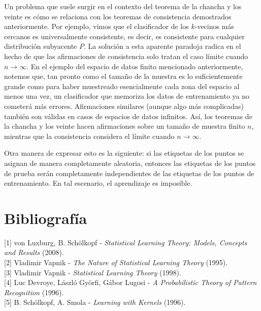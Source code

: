 \documentclass{report}
\begin{document}
Un problema que suele surgir en el contexto del teorema de la chancha y los veinte es cómo se relaciona con los 
teoremas de consistencia demostrados anteriormente. Por ejemplo, vimos que el clasificador 
de los \(k\)-vecinos más cercanos es universalmente consistente, es decir, es consistente para cualquier 
distribución subyacente \(P\). La solución a esta aparente paradoja radica en el hecho de que las afirmaciones de consistencia solo tratan 
el caso límite cuando \(n \to \infty\). En el ejemplo del espacio de datos finito mencionado anteriormente, 
notemos que, tan pronto como el tamaño de la muestra es lo suficientemente grande como para haber muestreado 
esencialmente cada zona del espacio al menos una vez, un clasificador que memoriza los datos de entrenamiento 
ya no cometerá más errores. Afirmaciones similares (aunque algo más complicadas) también son válidas en casos 
de espacios de datos infinitos. Así, los teoremas de la chancha y los veinte hacen afirmaciones sobre un tamaño de muestra finito \(n\), mientras que 
la consistencia considera el límite cuando \(n \to \infty\).\newline

Otra manera de expresar esto es la siguiente: si las etiquetas de los puntos se asignan de manera 
completamente aleatoria, entonces las etiquetas de los puntos de prueba serán completamente independientes 
de las etiquetas de los puntos de entrenamiento. En tal escenario, el aprendizaje es imposible.\newline



\chapter*{Bibliografía}

[1] von Luxburg, B. Schölkopf - \textit{Statistical Learning Theory: Models, Concepts and Results} (2008). \\

[2] Vladimir Vapnik - \textit{The Nature of Statistical Learning Theory} (1995). \\

[3] Vladimir Vapnik  - \textit{Statistical Learning Theory} (1998). \\

[4] Luc Devroye, László Györfi, Gábor Lugosi - \textit{A Probabilistic Theory of Pattern Recognition} (1996). \\

[5] B. Schölkopf, A. Smola - \textit{Learning with Kernels} (1996). \\
\end{document}
